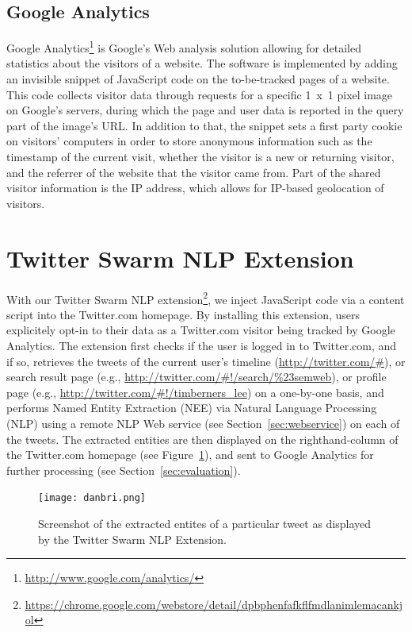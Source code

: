 \documentclass[runningheads,a4paper]{llncs}
\begin{document}
\subsection{Google Analytics}
Google Analytics\footnote{\url{http://www.google.com/analytics/}} is Google's Web analysis solution allowing for detailed statistics about the visitors of a website. The software is implemented by adding an invisible snippet of JavaScript code on the to-be-tracked pages of a website. This code collects visitor data through requests for a specific 1~x~1 pixel image on Google's servers, during which the page and user data is reported in the query part of the image's URL. In addition to that, the snippet sets a first party cookie on visitors' computers in order to store anonymous information such as the timestamp of the current visit, whether the visitor is a new or returning visitor, and the referrer of the website that the visitor came from. Part of the shared visitor information is the IP address, which allows for IP-based geolocation of visitors.
 
\section{Twitter Swarm NLP Extension}\label{sec:twitterswarm}
With our Twitter Swarm NLP extension\footnote{\url{https://chrome.google.com/webstore/detail/dpbphenfafkflfmdlanimlemacankjol}}, we inject JavaScript code via a content script into the Twitter.com homepage. By installing this extension, users explicitely opt-in to their data as a Twitter.com visitor being tracked by Google Analytics. The extension first checks if the user is logged in to Twitter.com, and if so, retrieves the tweets of the current user's timeline (\url{http://twitter.com/#}), or search result page (e.g., \url{http://twitter.com/#!/search/%23semweb}), or profile page (e.g., \url{http://twitter.com/#!/timberners_lee}) on a one-by-one basis, and performs Named Entity Extraction (NEE) via Natural Language Processing (NLP) using a remote NLP Web service (see Section~\ref{sec:webservice}) on each of the tweets. The extracted entities are then displayed on the righthand-column of the Twitter.com homepage (see Figure~\ref{fig:danbri}), and sent to Google Analytics for further processing (see Section~\ref{sec:evaluation}).

\begin{figure}[ht!]
  \centering
  \texttt{[image: danbri.png]}
  \caption{Screenshot of the extracted entites of a particular tweet as displayed by the Twitter Swarm NLP Extension.}
  \label{fig:danbri}
\end{figure}
\end{document}
